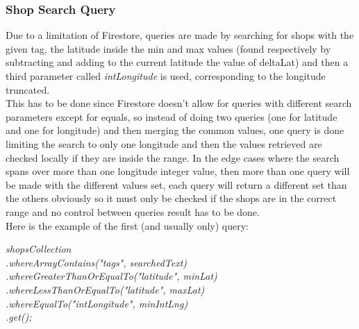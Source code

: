\subsubsection{Shop Search Query}
Due to a limitation of Firestore, queries are made by searching for shops with the given tag, the latitude inside the min and max values (found respectively by subtracting and adding to the current latitude the value of deltaLat) and then a third parameter called \textit{intLongitude} is used, corresponding to the longitude truncated.\\
This has to be done since Firestore doesn't allow for queries with different search parameters except for equals, so instead of doing two queries (one for latitude and one for longitude) and then merging the common values, one query is done limiting the search to only one longitude and then the values retrieved are checked locally if they are inside the range. In the edge cases where the search spans over more than one longitude integer value, then more than one query will be made with the different values set, each query will return a different set than the others obviously so it must only be checked if the shops are in the correct range and no control between queries result has to be done.\\
Here is the example of the first (and usually only) query:\\
\begin{center}
\textit{shopsCollection\\
.whereArrayContains("tags", searchedText)\\
.whereGreaterThanOrEqualTo("latitude", minLat)\\
.whereLessThanOrEqualTo("latitude", maxLat)\\
.whereEqualTo("intLongitude", minIntLng)\\
.get();}
\end{center}
\clearpage
